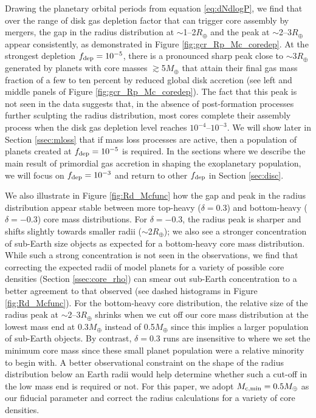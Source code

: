 \documentclass[twocolumn]{aastex631}
\begin{document}
Drawing the planetary orbital periods from equation \ref{eq:dNdlogP}, we find that over the range of disk gas depletion factor that can trigger core assembly by mergers, the gap in the radius distribution at $\sim$1--2$R_\oplus$ and the peak at $\sim$2--3$R_\oplus$ appear consistently, as demonstrated in Figure \ref{fig:gcr_Rp_Mc_coredep}. At the strongest depletion $f_{\rm dep}=10^{-5}$, there is a pronounced sharp peak close to $\sim$3$R_\oplus$ generated by planets with core masses $\gtrsim$5$M_\oplus$ that attain their final gas mass fraction of a few to ten percent by reduced global disk accretion (see left and middle panels of Figure \ref{fig:gcr_Rp_Mc_coredep}). The fact that this peak is not seen in the data suggests that, in the absence of post-formation processes further sculpting the radius distribution, most cores complete their assembly process when the disk gas depletion level reaches $10^{-4}$--$10^{-3}$. We will show later in Section \ref{ssec:mloss} that if mass loss processes are active, then a population of planets created at $f_{\rm dep}=10^{-5}$ is required. In the sections where we describe the main result of primordial gas accretion in shaping the exoplanetary population, we will focus on $f_{\rm dep}=10^{-3}$ and return to other $f_{\rm dep}$ in Section \ref{sec:disc}.

We also illustrate in Figure \ref{fig:Rd_Mcfunc} how the gap and peak in the radius distribution appear stable between more top-heavy ($\delta=0.3$) and bottom-heavy ($\delta=-0.3$) core mass distributions. For $\delta=-0.3$, the radius peak is sharper and shifts slightly towards smaller radii ($\sim$2$R_\oplus$); we also see a stronger concentration of sub-Earth size objects as expected for a bottom-heavy core mass distribution. While such a strong concentration is not seen in the observations, we find that correcting the expected radii of model planets for a variety of possible core densities (Section \ref{ssec:core_rho}) can smear out sub-Earth concentration to a better agreement to that observed (see dashed histograms in Figure \ref{fig:Rd_Mcfunc}). For the bottom-heavy core distribution, the relative size of the radius peak at $\sim$2--3$R_\oplus$ shrinks when we cut off our core mass distribution at the lowest mass end at 0.3$M_\oplus$ instead of 0.5$M_\oplus$ since this implies a larger population of sub-Earth objects. By contrast, $\delta=0.3$ runs are insensitive to where we set the minimum core mass since these small planet population were a relative minority to begin with. A better observational constraint on the shape of the radius distribution below an Earth radii would help determine whether such a cut-off in the low mass end is required or not. For this paper, we adopt $M_{\rm c,min}=0.5M_\oplus$ as our fiducial parameter and correct the radius calculations for a variety of core densities. 
\end{document}
